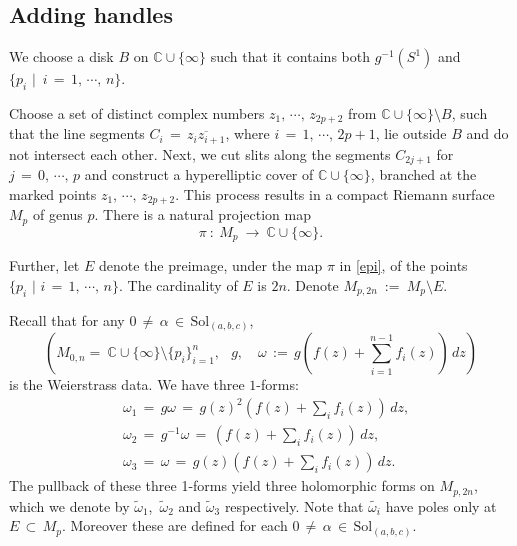 \documentclass[12pt]{amsart}
\numberwithin{equation}{section}
\begin{document}
\subsection{Adding handles}\label{subsec:Adding handels}
We choose a disk $B$ on $\mathbb{C}\cup\{\infty\}$ such that
it contains both \( g^{-1}(S^1) \) and \(\{p_i\,\,\big\vert\,\,\, i\,=\,1, \,\cdots,\, n\}\).

Choose a set of distinct complex numbers \( z_1,\, \cdots,\, z_{2p+2} \) from \( \mathbb{C} \cup \{\infty\}
\setminus B \), such that the line segments \( C_i\, =\, \overline{z_i z_{i+1}} \), where
\( i\,=\,1,\, \cdots,\, 2p+1 \), lie outside \( B \) and do not intersect each other. Next, we cut slits along the
segments \( C_{2j+1} \) for \( j\,=\,0,\, \cdots,\, p \) and construct a hyperelliptic cover of
\( \mathbb{C} \cup \{\infty\} \), branched at the marked points \( z_1,\, \cdots,\, z_{2p+2} \). This process
results in a compact Riemann surface \( M_p \) of genus \( p \). There is a natural projection map
\begin{equation}\label{epi}
\pi\ :\ M_p \ \longrightarrow\ \mathbb{C} \cup \{\infty\}.
\end{equation}

Further, let \( E \) denote the preimage, under the map $\pi$ in \eqref{epi}, of the points
\( \{p_i \,\,\big\vert\,\, i\,=\,1,\, \cdots,\, n\} \). The cardinality of \( E \) is \( 2n \). Denote
\( M_{p, 2n} \ :=\ M_p \setminus E \).

Recall that for any \(0\, \neq\, \alpha\, \in\, \text{Sol}_{(a,b,c)}\), 
$$\left(M_{0,n} =\ \mathbb{C} \cup
\{\infty\} \setminus \{p_i\}_{i=1}^n,\,\;\; g,\, \;\;\; \omega
\,:=\, g(f(z) + \sum_{i=1}^{n-1} f_i(z)) \, dz\right)$$
is the Weierstrass data. We have three $1$-forms:
\begin{align}
  &\omega_1 \,=\, g \omega \,=\, g(z)^2 \left(f(z) + \sum_i f_i(z)\right) \, dz, \label{en:starting equation for omega1} \\
  &\omega_2 \,=\, g^{-1} \omega \,=\, \left(f(z) + \sum_i f_i(z)\right) \, dz, \label{en:starting equation for omega2} \\
  &\omega_3 \,=\, \omega \,=\, g(z) \left(f(z) + \sum_i f_i(z)\right) \, dz. \label{en:starting equation for omega3}
\end{align}
The pullback of these three 1-forms yield three holomorphic forms on \(M_{p, 2n}\), which we
denote by \(\widetilde{\omega}_1\),\, \(\widetilde{\omega}_2\) and \(\widetilde{\omega}_3\) respectively.
Note that $\widetilde{\omega_i}$  have poles only at \(E\,\subset\, M_{p}\).
Moreover these are defined for each $0\, \neq\, \alpha \,\in\, \text{Sol}_{(a,b,c)}$. 
\end{document}
